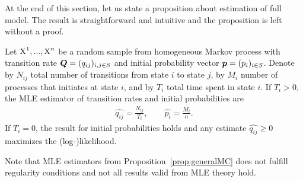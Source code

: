 {

At the end of this section, let us state a proposition about estimation of full model. The result is straightforward and intuitive and the proposition is left without a proof.

\begin{proposition}
	Let $\operatorname{\bm{X}}^1, ..., \operatorname{\bm{X}}^n$ be a random sample from homogeneous Markov process with transition rate $\bm{Q} = (q_{ij})_{i,j \in S}$ and initial probability vector $\bm{p} = (p_i)_{i \in S}$. Denote by $N_{ij}$ total number of transitions from state $i$ to state $j$, by $M_i$ number of processes that initiates at state $i$, and by $T_i$ total time spent in state $i$. If $T_i > 0$, the MLE estimator of transition rates and initial probabilities are
	\begin{align*}
		\widehat{q_{ij}} = \frac{N_{ij}}{T_i}, \qquad
		\widehat{p_i} = \frac{M_i}{n}.
	\end{align*}
	If $T_i = 0$, the result for initial probabilities holds and any estimate $\widehat{q_{ij}} \geq 0$ maximizes the (log-)likelihood.
	\label{prop:generalMC}
\end{proposition}

Note that MLE estimators from Proposition~\ref{prop:generalMC} does not fulfill regularity conditions and not all results valid from MLE theory hold.




}
